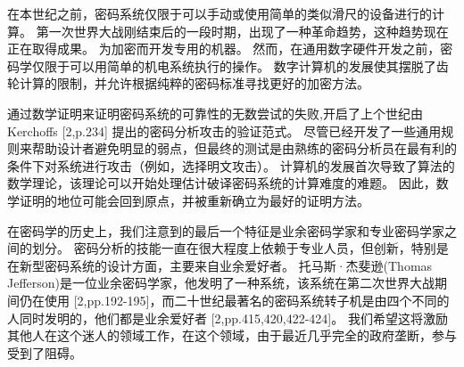 \documentclass[]{article}
\begin{document}
	在本世纪之前，密码系统仅限于可以手动或使用简单的类似滑尺的设备进行的计算。
	第一次世界大战刚结束后的一段时期，出现了一种革命趋势，这种趋势现在正在取得成果。
	为加密而开发专用的机器。
	然而，在通用数字硬件开发之前，密码学仅限于可以用简单的机电系统执行的操作。
	数字计算机的发展使其摆脱了齿轮计算的限制，并允许根据纯粹的密码标准寻找更好的加密方法。
	
	通过数学证明来证明密码系统的可靠性的无数尝试的失败,开启了上个世纪由Kerchoffs [2,p.234] 提出的密码分析攻击的验证范式。
	尽管已经开发了一些通用规则来帮助设计者避免明显的弱点，但最终的测试是由熟练的密码分析员在最有利的条件下对系统进行攻击（例如，选择明文攻击）。
	计算机的发展首次导致了算法的数学理论，该理论可以开始处理估计破译密码系统的计算难度的难题。
	因此，数学证明的地位可能会回到原点，并被重新确立为最好的证明方法。
	
	在密码学的历史上，我们注意到的最后一个特征是业余密码学家和专业密码学家之间的划分。
	密码分析的技能一直在很大程度上依赖于专业人员，但创新，特别是在新型密码系统的设计方面，主要来自业余爱好者。
	托马斯·杰斐逊(Thomas Jefferson)是一位业余密码学家，他发明了一种系统，该系统在第二次世界大战期间仍在使用 [2,pp.192-195]，而二十世纪最著名的密码系统转子机是由四个不同的人同时发明的，他们都是业余爱好者 [2,pp.415,420,422-424]。
	我们希望这将激励其他人在这个迷人的领域工作，在这个领域，由于最近几乎完全的政府垄断，参与受到了阻碍。
	
\end{document}
